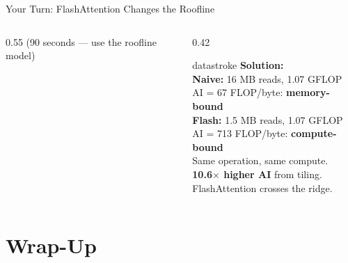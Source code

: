 \documentclass[aspectratio=169, 12pt]{beamer}
\begin{document}
\begin{frame}{Your Turn: FlashAttention Changes the Roofline}
\begin{columns}[T]
\begin{column}{0.55\textwidth}
    {\footnotesize\textcolor{midgray}{(90 seconds --- use the roofline model)}}
  \end{column}
  \begin{column}{0.42\textwidth}
    \pause
    \begin{mlsyscard}{datastroke}
    \textbf{Solution:}\\[0.05cm]
    {\scriptsize
    \textbf{Naive:} 16 MB reads, 1.07 GFLOP\\
    AI = 67 FLOP/byte: \textcolor{errorstroke}{\textbf{memory-bound}}\\[0.05cm]
    \textbf{Flash:} 1.5 MB reads, 1.07 GFLOP\\
    AI = 713 FLOP/byte: \textcolor{datastroke}{\textbf{compute-bound}}\\[0.1cm]
    Same operation, same compute.\\
    \textbf{10.6$\times$ higher AI} from tiling.\\
    FlashAttention crosses the ridge.
    }
    \end{mlsyscard}
  \end{column}
\end{columns}

\end{frame}

\section{Wrap-Up}
\end{document}
